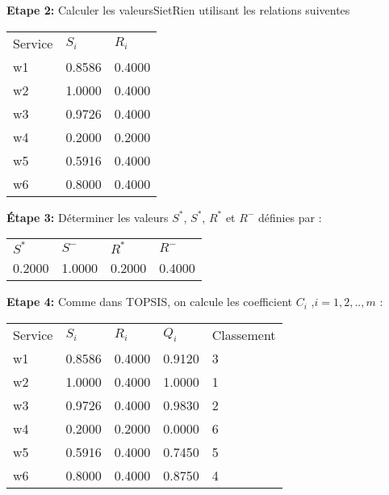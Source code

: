 \documentclass[french, 11pt, a4paper, oldfontcommands]{report}
\begin{document}
	\textbf{Etape 2:} Calculer les valeursSietRien utilisant les relations suiventes
\begin{table}[ht]
	\begin{tabular}{lll}
	\rowcolor[HTML]{9B9B9B} 
	Service & $S_i$  & $R_i$  \\
	w1      & 0.8586 & 0.4000 \\
	\rowcolor[HTML]{EFEFEF} 
	w2      & 1.0000 & 0.4000 \\
	w3      & 0.9726 & 0.4000 \\
	\rowcolor[HTML]{EFEFEF} 
	w4      & 0.2000 & 0.2000 \\
	w5      & 0.5916 & 0.4000 \\
	\rowcolor[HTML]{EFEFEF} 
	w6      & 0.8000 & 0.4000
	\end{tabular}
	\end{table}
	\textbf{Étape 3:} Déterminer les valeurs $S^*$, $S^*$, $R^*$ et $R^-$ définies par : \\
\begin{table}[ht]
	\begin{tabular}{llll}
	\rowcolor[HTML]{9B9B9B} 
	$S^*$  & $S^-$  & $R^*$  & $R^-$  \\
	0.2000 & 1.0000 & 0.2000 & 0.4000
	\end{tabular}
	\end{table}

	\textbf{Etape 4:} Comme dans TOPSIS, on calcule les coefficient $C_{i}$ ,\textit{$i = 1,2,..,m$  }:
\begin{table}[ht]
	\begin{tabular}{lllll}
	\rowcolor[HTML]{9B9B9B} 
	Service & $S_i$  & $R_i$  & $Q_i$  & Classement \\
	w1      & 0.8586 & 0.4000 & 0.9120 & 3          \\
	\rowcolor[HTML]{EFEFEF} 
	w2      & 1.0000 & 0.4000 & 1.0000 & 1          \\
	w3      & 0.9726 & 0.4000 & 0.9830 & 2          \\
	\rowcolor[HTML]{EFEFEF} 
	w4      & 0.2000 & 0.2000 & 0.0000 & 6          \\
	w5      & 0.5916 & 0.4000 & 0.7450 & 5          \\
	\rowcolor[HTML]{EFEFEF} 
	w6      & 0.8000 & 0.4000 & 0.8750 & 4         
	\end{tabular}
	\end{table}
\end{document}
